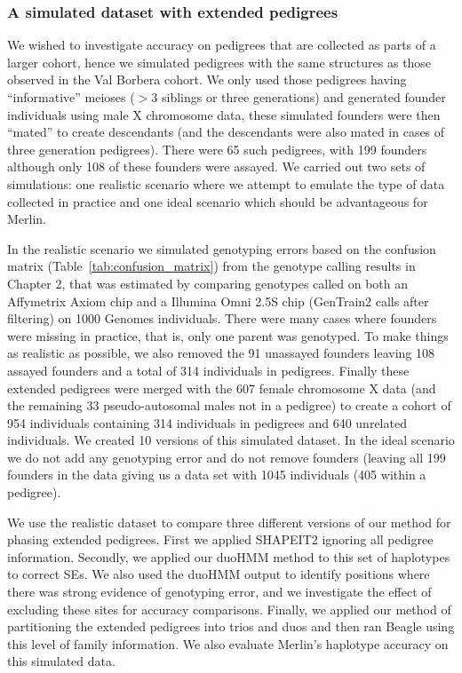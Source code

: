 \subsubsection{A simulated dataset with extended pedigrees}
\label{chap4:pedsim1}
We wished to investigate accuracy on pedigrees that are collected as parts of a larger cohort, hence we simulated pedigrees with the same structures as those observed in the Val Borbera cohort.  We only used those pedigrees having ``informative'' meioses ($>3$ siblings or three generations) and generated founder individuals using male X chromosome data, these simulated founders were then ``mated'' to create descendants (and the descendants were also mated in cases of three generation pedigrees).  There were 65 such pedigrees, with 199 founders although only 108 of these founders were assayed. We carried out two sets of simulations: one realistic scenario where we attempt to emulate the type of data collected in practice and one ideal scenario which should be advantageous for Merlin.  

In the realistic scenario we simulated genotyping errors based on the confusion matrix (Table~\ref{tab:confusion_matrix}) from the genotype calling results in Chapter 2, that was estimated by comparing genotypes called on both an Affymetrix Axiom chip and a Illumina Omni 2.5S chip (GenTrain2 calls after filtering)  on 1000 Genomes individuals. There were many cases where founders were missing in practice, that is, only one parent was genotyped.  To make things as realistic as possible, we also removed the 91 unassayed founders leaving 108 assayed founders and a total of 314 individuals in pedigrees.  Finally these extended pedigrees were merged with the  607 female chromosome X data (and the remaining 33 pseudo-autosomal males not in a pedigree) to create a cohort of 954 individuals containing 314 individuals in pedigrees and 640 unrelated individuals. We created 10 versions of this simulated dataset. In the ideal scenario we do not add any genotyping error and do not remove founders (leaving all 199 founders in the data giving us a data set with 1045 individuals (405 within a pedigree).

We use the realistic dataset to compare three different versions of our method for phasing extended pedigrees. First we applied SHAPEIT2 ignoring all pedigree information. Secondly, we applied our duoHMM method to this set of haplotypes to correct SEs. We also used the duoHMM output to identify positions where there was strong evidence of genotyping error, and we investigate the effect of excluding these sites for accuracy comparisons. Finally, we applied our method of partitioning the extended pedigrees into trios and duos and then ran Beagle using this level of family information.  We also evaluate Merlin's haplotype accuracy on this simulated data.

